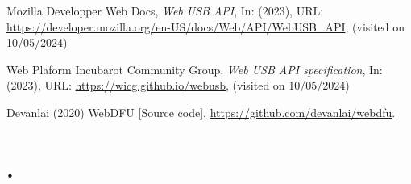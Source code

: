 \documentclass[francais]{rapportPFE}  %
\begin{document}
\begin{thebibliography}{9}
    

        Mozilla Developper Web Docs,
        \textit{Web USB API},
        In: (2023),
        URL: \url{https://developer.mozilla.org/en-US/docs/Web/API/WebUSB_API},
        (visited on 10/05/2024)
    
    
        Web Plaform Incubarot Community Group,
        \textit{Web USB API specification},
        In: (2023),
        URL: \url{https://wicg.github.io/webusb},
        (visited on 10/05/2024)

    
    
    
        Devanlai (2020) WebDFU [Source code]. \url{https://github.com/devanlai/webdfu}.


    
\end{thebibliography}

\appendix
\section{.}
\end{document}
